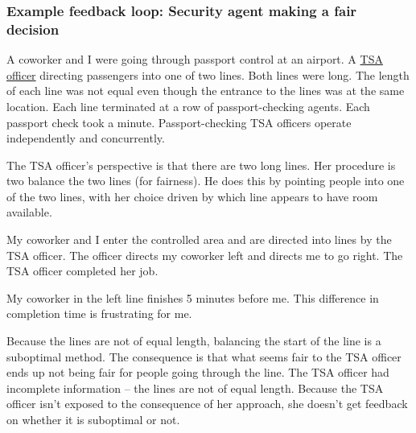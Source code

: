 \subsubsection{Example feedback loop: Security agent making a fair decision}
\begin{mdframed}
A coworker and I were going through passport control at an airport. 
A \href{https://en.wikipedia.org/wiki/Transportation_Security_Administration}{TSA officer} 
directing passengers into one of two lines. Both lines were long. The length of each line was not equal even though the entrance to the lines was at the same location. Each line terminated at a row of passport-checking agents. Each passport check took a minute. Passport-checking TSA officers operate independently and concurrently.


The TSA officer's perspective is that there are two long lines. Her procedure is two balance the two lines (for fairness). He does this by pointing people into one of the two lines, with her choice driven by which line appears to have room available.

My coworker and I enter the controlled area and are directed into lines by the TSA officer. The officer directs my coworker left and directs me to go right. The TSA officer completed her job.

My coworker in the left line finishes 5 minutes before me. This difference in completion time is frustrating for me.

Because the lines are not of equal length, balancing the start of the line is a suboptimal method. The consequence is that what seems fair to the TSA officer ends up not being fair for people going through the line. The TSA officer had incomplete information -- the lines are not of equal length. Because the TSA officer isn't exposed to the consequence of her approach, she doesn't get feedback on whether it is suboptimal or not.
\end{mdframed}

